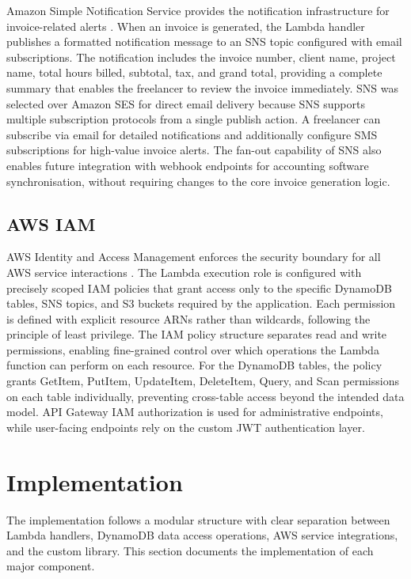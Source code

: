 \documentclass[conference]{IEEEtran}
\begin{document}
Amazon Simple Notification Service provides the notification infrastructure for invoice-related alerts \cite{awssns}. When an invoice is generated, the Lambda handler publishes a formatted notification message to an SNS topic configured with email subscriptions. The notification includes the invoice number, client name, project name, total hours billed, subtotal, tax, and grand total, providing a complete summary that enables the freelancer to review the invoice immediately. SNS was selected over Amazon SES for direct email delivery because SNS supports multiple subscription protocols from a single publish action. A freelancer can subscribe via email for detailed notifications and additionally configure SMS subscriptions for high-value invoice alerts. The fan-out capability of SNS also enables future integration with webhook endpoints for accounting software synchronisation, without requiring changes to the core invoice generation logic.

\subsection{AWS IAM}

AWS Identity and Access Management enforces the security boundary for all AWS service interactions \cite{awsiam}. The Lambda execution role is configured with precisely scoped IAM policies that grant access only to the specific DynamoDB tables, SNS topics, and S3 buckets required by the application. Each permission is defined with explicit resource ARNs rather than wildcards, following the principle of least privilege. The IAM policy structure separates read and write permissions, enabling fine-grained control over which operations the Lambda function can perform on each resource. For the DynamoDB tables, the policy grants GetItem, PutItem, UpdateItem, DeleteItem, Query, and Scan permissions on each table individually, preventing cross-table access beyond the intended data model. API Gateway IAM authorization is used for administrative endpoints, while user-facing endpoints rely on the custom JWT authentication layer.

\section{Implementation}

The implementation follows a modular structure with clear separation between Lambda handlers, DynamoDB data access operations, AWS service integrations, and the custom library. This section documents the implementation of each major component.
\end{document}
